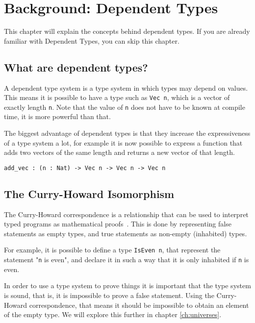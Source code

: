 \chapter{\label{chap:bg-dp}Background: Dependent Types}

This chapter will explain the concepts behind dependent types. If you are already familiar with Dependent Types, you can skip this chapter. 

\section{What are dependent types?}

A dependent type system is a type system in which types may depend on values. This means it is possible to have a type such as \verb|Vec n|, which is a vector of exactly length \verb|n|. Note that the value of \verb|n| does not have to be known at compile time, it is more powerful than that. 

The biggest advantage of dependent types is that they increase the expressiveness of a type system a lot, for example it is now possible to express a function that adds two vectors of the same length and returns a new vector of that length. 
\begin{lstlisting}
add_vec : (n : Nat) -> Vec n -> Vec n -> Vec n
\end{lstlisting}

\section{The Curry-Howard Isomorphism}

The Curry-Howard correspondence is a relationship that can be used to interpret typed programs as mathematical proofs~\cite{chc}. This is done by representing false statements as empty types, and true statements as non-empty (inhabited) types. 

For example, it is possible to define a type \verb|IsEven n|, that represent the statement "\verb|n| is even", and declare it in such a way that it is only inhabited if \verb|n| is even.

In order to use a type system to prove things it is important that the type system is sound, that is, it is impossible to prove a false statement. Using the Curry-Howard correspondence, that means it should be impossible to obtain an element of the empty type. We will explore this further in chapter \ref{ch:universes}.

